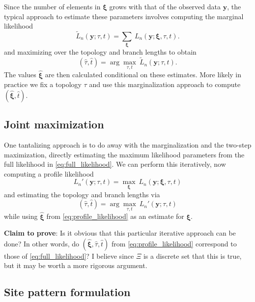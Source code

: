 \documentclass[a4paper]{article}
\begin{document}
Since the number of elements in $\boldsymbol\xi$ grows with that of the observed data $\mathbf{y}$, the typical approach to estimate these parameters involves computing the marginal likelihood
\begin{equation}
\label{eq:marginal_likelihood}
\tilde{L}_n(\mathbf{y}; \tau, t) = \sum_{\boldsymbol\xi} \ L_n(\mathbf{y};\boldsymbol\xi, \tau, t).
\end{equation}
and maximizing over the topology and branch lengths to obtain
$$
(\hat{\tau}, \hat{t}) = \arg\max_{\tau, t} \  \tilde{L}_n(\mathbf{y}; \tau, t).
$$
The values $\hat{\boldsymbol\xi}$ are then calculated conditional on these estimates.
More likely in practice we fix a topology $\tau$ and use this marginalization approach to compute $(\hat{\boldsymbol\xi}, \hat{t})$.

\subsection{Joint maximization}

One tantalizing approach is to do away with the marginalization and the two-step maximization, directly estimating the maximum likelihood parameters from the full likelihood in \eqref{eq:full_likelihood}.
We can perform this iteratively, now computing a profile likelihood
\begin{equation}
\label{eq:profile_likelihood}
L_n'(\mathbf{y};\tau, t) = \max_{\boldsymbol\xi} \ L_n(\mathbf{y};\boldsymbol\xi, \tau, t)
\end{equation}
and estimating the topology and branch lengths via
$$
(\hat{\tau}, \hat{t}) = \arg\max_{\tau, t} \ L_n'(\mathbf{y};\tau, t)
$$
while using $\hat{\boldsymbol\xi}$ from \eqref{eq:profile_likelihood} as an estimate for $\boldsymbol\xi$.

\textbf{Claim to prove}: Is it obvious that this particular iterative approach can be done?
In other words, do $(\hat{\boldsymbol\xi}, \hat{\tau}, \hat{t})$ from \eqref{eq:profile_likelihood} correspond to those of \eqref{eq:full_likelihood}?
I believe since $\Xi$ is a discrete set that this is true, but it may be worth a more rigorous argument.

\subsection{Site pattern formulation}
\end{document}
